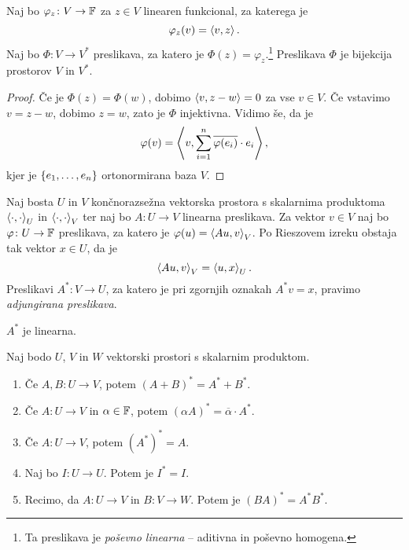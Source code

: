 \documentclass[12pt, a4paper]{article}
\begin{document}
\begin{izrek}[Riesz]
Naj bo $\varphi_z\colon V\to\mathbb{F}$ za $z\in V$ linearen funkcional, za katerega je
\[
\varphi_z(v)=\left\langle v,z\right\rangle.
\]
Naj bo $\Phi\colon V\to V^*$ preslikava, za katero je $\Phi(z)=\varphi_z$.\footnote{Ta preslikava je \emph{poševno linearna} -- aditivna in poševno homogena.} Preslikava $\Phi$ je bijekcija prostorov $V$ in $V^*$.
\end{izrek}

\begin{proof}
Če je $\Phi(z)=\Phi(w)$, dobimo $\left\langle v,z-w\right\rangle=0$ za vse $v\in V$. Če vstavimo $v=z-w$, dobimo $z=w$, zato je $\Phi$ injektivna. Vidimo še, da je
\[
\varphi(v)=\left\langle v,\sum_{i=1}^n\overline{\varphi(e_i)}\cdot e_i\right\rangle,
\]
kjer je $\left\{e_1,\dots,e_n\right\}$ ortonormirana baza $V$.
\end{proof}

\begin{okvir}
\begin{definicija}
Naj bosta $U$ in $V$ končnorazsežna vektorska prostora s skalarnima produktoma $\left\langle \cdot,\cdot\right\rangle_U$ in $\left\langle \cdot,\cdot\right\rangle_V$ ter naj bo $A\colon U\to V$ linearna preslikava. Za vektor $v\in V$ naj bo $\varphi\colon U\to\mathbb{F}$ preslikava, za katero je $\varphi(u)=\left\langle Au,v\right\rangle_V$. Po Rieszovem izreku obstaja tak vektor $x\in U$, da je
\[
\left\langle Au,v\right\rangle_V=\left\langle u,x\right\rangle_U.
\]
Preslikavi $A^*\colon V\to U$, za katero je pri zgornjih oznakah $A^*v=x$, pravimo \emph{adjungirana preslikava}.
\end{definicija}
\end{okvir}

\begin{trditev}
$A^*$ je linearna.
\end{trditev}

\obvs

\begin{trditev}
Naj bodo $U$, $V$ in $W$ vektorski prostori s skalarnim produktom.

\begin{enumerate}[label=\roman*)]
\item Če $A,B\colon U\to V$, potem $(A+B)^*=A^*+B^*$.
\item Če $A\colon U\to V$ in $\alpha\in\mathbb{F}$, potem $(\alpha A)^*=\overline{\alpha}\cdot A^*$.
\item Če $A\colon U\to V$, potem $(A^*)^*=A$.
\item Naj bo $I\colon U\to U$. Potem je $I^*=I$.
\item Recimo, da $A\colon U\to V$ in $B\colon V\to W$. Potem je $(BA)^*=A^*B^*$.\label{5}
\end{enumerate}
\end{trditev}
\end{document}
